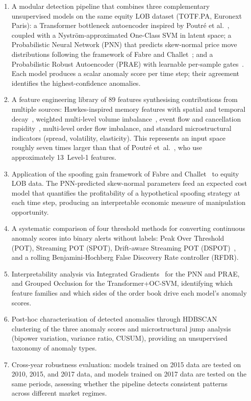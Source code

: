 \documentclass[11pt]{report}
\begin{document}
\begin{enumerate}
    \item A modular detection pipeline that combines three complementary unsupervised models on the same equity LOB dataset (TOTF.PA, Euronext Paris): a Transformer bottleneck autoencoder inspired by Poutr\'e et al.~\cite{poutre_2024}, coupled with a Nystr\"om-approximated One-Class SVM in latent space; a Probabilistic Neural Network (PNN) that predicts skew-normal price move distributions following the framework of Fabre and Challet~\cite{fabre_2025}; and a Probabilistic Robust Autoencoder (PRAE) with learnable per-sample gates~\cite{lindenbaum2022prae}. Each model produces a scalar anomaly score per time step; their agreement identifies the highest-confidence anomalies.

    \item A feature engineering library of 89 features synthesising contributions from multiple sources: Hawkes-inspired memory features with spatial and temporal decay~\cite{fabre_2025}, weighted multi-level volume imbalance~\cite{tao_2020}, event flow and cancellation rapidity~\cite{poutre_2024}, multi-level order flow imbalance, and standard microstructural indicators (spread, volatility, elasticity).
      This represents an input space roughly seven times larger than that of Poutr\'e et~al.~\cite{poutre_2024}, who use approximately 13~Level-1 features.

    \item Application of the spoofing gain framework of Fabre and Challet~\cite{fabre_2025} to equity LOB data.  The PNN-predicted skew-normal parameters feed an expected cost model that quantifies the profitability of a hypothetical spoofing strategy at each time step, producing an interpretable economic measure of manipulation opportunity.

    \item A systematic comparison of four threshold methods for converting continuous anomaly scores into binary alerts without labels: Peak Over Threshold (POT), Streaming POT (SPOT), Drift-aware Streaming POT (DSPOT)~\cite{siffer:hal-01640325}, and a rolling Benjamini-Hochberg False Discovery Rate controller (RFDR).

    \item Interpretability analysis via Integrated Gradients~\cite{sundararajan2017axiomaticattributiondeepnetworks} for the PNN and PRAE, and Grouped Occlusion for the Transformer+OC-SVM, identifying which feature families and which sides of the order book drive each model's anomaly scores.

    \item Post-hoc characterisation of detected anomalies through HDBSCAN clustering of the three anomaly scores and microstructural jump analysis (bipower variation, variance ratio, CUSUM), providing an unsupervised taxonomy of anomaly types.

    \item Cross-year robustness evaluation: models trained on 2015 data are tested on 2010, 2015, and 2017 data, and models trained on 2017 data are tested on the same periods, assessing whether the pipeline detects consistent patterns across different market regimes.
\end{enumerate}
\end{document}
